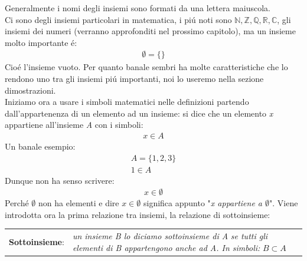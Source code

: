 \documentclass[twoside]{article} %
\begin{document}
	Generalmente i nomi degli insiemi sono formati da una lettera maiuscola.\\
	Ci sono degli insiemi particolari in matematica, i pi\'u noti sono $\mathbb{N}, \mathbb{Z}, \mathbb{Q}, \mathbb{R}, \mathbb{C}$, gli insiemi dei numeri (verranno approfonditi nel prossimo capitolo), ma un insieme molto importante \'e:
	\begin{gather*}  %
		\emptyset = \{\}
	\end{gather*}
	Cio\'e l'insieme vuoto. Per quanto banale sembri ha molte caratteristiche che lo rendono uno tra gli insiemi pi\'u importanti, noi lo useremo nella sezione dimostrazioni.\\	
	Iniziamo ora a usare i simboli matematici nelle definizioni partendo\\ dall'appartenenza di un elemento ad un insieme: si dice che un elemento \textit{x} appartiene all'insieme \textit{A} con i simboli:
	\begin{gather*}
		x\in A
	\end{gather*}
	Un banale esempio:	
	\begin{gather*}
		A=\{1,2,3\} \\
		1\in A
	\end{gather*}
	Dunque non ha senso scrivere:
	\begin{gather*}
		x\in \emptyset
	\end{gather*}	
	Perch\'e $\emptyset$ non ha elementi e dire $x\in \emptyset$ significa appunto "\textit{x appartiene a $\emptyset$}".
	Viene introdotta ora la prima relazione tra insiemi, la relazione di sottoinsieme:
	
	\begin{center}
		\begin{tabular}{ll}
			\textbf{Sottoinsieme}:&\makecell[tl]{\textit{un insieme B lo diciamo sottoinsieme di A}\\\textit{se tutti gli elementi di B appartengono}\\\textit{anche ad A. In simboli:} $B\subset A$}
		\end{tabular}
	\end{center}
	
\end{document}
